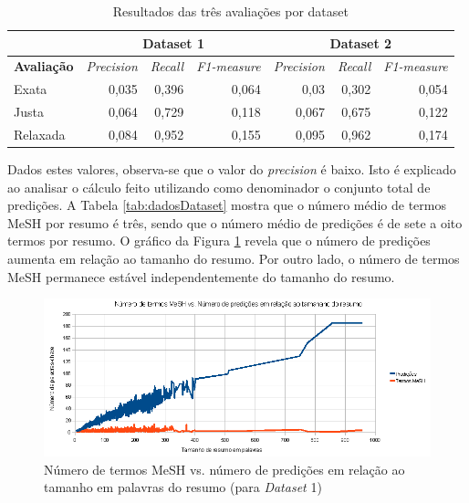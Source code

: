 \begin{table}[htbp]
\center
\begin{tabular}{|l|r|r|r|r|r|r|}
\hline
 & \multicolumn{ 3}{c|}{\textbf{Dataset 1}} & \multicolumn{ 3}{c|}{\textbf{Dataset 2}} \\ \hline
\textbf{Avaliação} & \multicolumn{1}{l|}{\textit{Precision}} & \multicolumn{1}{l|}{\textit{Recall}} & \multicolumn{1}{l|}{\textit{F1-measure}} & \multicolumn{1}{l|}{\textit{Precision}} & \multicolumn{1}{l|}{\textit{Recall}} & \multicolumn{1}{l|}{\textit{F1-measure}} \\ \hline
Exata & 0,035 & 0,396 & 0,064 & 0,03 & 0,302 & 0,054 \\ \hline
Justa & 0,064 & 0,729 & 0,118 & 0,067 & 0,675 & 0,122 \\ \hline
Relaxada & 0,084 & 0,952 & 0,155 & 0,095 & 0,962 & 0,174 \\ \hline
\end{tabular}
\caption{Resultados das três avaliações por dataset}
\label{tab:resultadosPrecisionRecallEE}
\end{table}

Dados estes valores, observa-se que o valor do \emph{precision} é baixo. Isto é explicado ao analisar o cálculo feito utilizando como denominador o conjunto total de predições. A Tabela \ref{tab:dadosDataset} mostra que o número médio de termos MeSH por resumo é três, sendo que o número médio de predições é de sete a oito termos por resumo. O gráfico da Figura \ref{fig:meshVsPredicoes} revela que o número de predições aumenta em relação ao tamanho do resumo. Por outro lado, o número de termos MeSH permanece estável independentemente do tamanho do resumo.

\begin{figure}[h!]
    \center    
    \includegraphics[scale=0.55]{imagens/meshVSpredicoes.png}
    \caption{Número de termos MeSH vs. número de predições em relação ao tamanho em palavras do resumo (para \emph{Dataset} 1)\label{fig:meshVsPredicoes}}
\end{figure}

